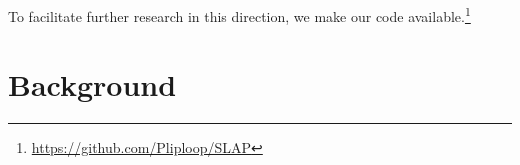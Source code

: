 \documentclass{article}
\begin{document}

To facilitate further research in this direction, we make our code available.\footnote{\hyperlink{https://github.com/Pliploop/SLAP}{https://github.com/Pliploop/SLAP}}

\section{Background}




\end{document}
